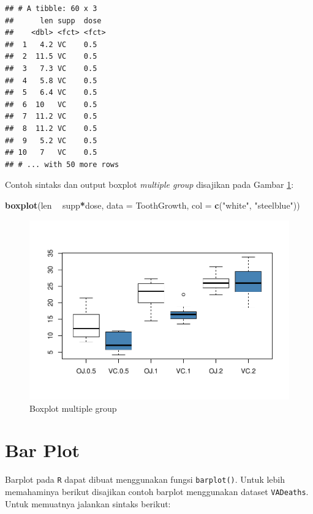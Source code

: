 \documentclass[]{book}
\newenvironment{Shaded}{\begin{snugshade}}{\end{snugshade}}
\newcommand{\KeywordTok}[1]{\textcolor[rgb]{0.13,0.29,0.53}{\textbf{#1}}}
\newcommand{\DataTypeTok}[1]{\textcolor[rgb]{0.13,0.29,0.53}{#1}}
\newcommand{\StringTok}[1]{\textcolor[rgb]{0.31,0.60,0.02}{#1}}
\newcommand{\OperatorTok}[1]{\textcolor[rgb]{0.81,0.36,0.00}{\textbf{#1}}}
\newcommand{\NormalTok}[1]{#1}
\begin{document}
\begin{verbatim}
## # A tibble: 60 x 3
##      len supp  dose 
##    <dbl> <fct> <fct>
##  1   4.2 VC    0.5  
##  2  11.5 VC    0.5  
##  3   7.3 VC    0.5  
##  4   5.8 VC    0.5  
##  5   6.4 VC    0.5  
##  6  10   VC    0.5  
##  7  11.2 VC    0.5  
##  8  11.2 VC    0.5  
##  9   5.2 VC    0.5  
## 10   7   VC    0.5  
## # ... with 50 more rows
\end{verbatim}

Contoh sintaks dan output boxplot \emph{multiple group} disajikan pada
Gambar \ref{fig:boxplot4}:

\begin{Shaded}
\begin{Highlighting}[]
\KeywordTok{boxplot}\NormalTok{(len }\OperatorTok{~}\StringTok{ }\NormalTok{supp}\OperatorTok{*}\NormalTok{dose, }\DataTypeTok{data =}\NormalTok{ ToothGrowth,}
        \DataTypeTok{col =} \KeywordTok{c}\NormalTok{(}\StringTok{"white"}\NormalTok{, }\StringTok{"steelblue"}\NormalTok{))}
\end{Highlighting}
\end{Shaded}

\begin{figure}

{\centering \includegraphics[width=0.7\linewidth]{EnvStat_files/figure-latex/boxplot4-1} 

}

\caption{Boxplot multiple group}\label{fig:boxplot4}
\end{figure}

\section{Bar Plot}\label{bar-plot}

Barplot pada \texttt{R} dapat dibuat menggunakan fungsi
\texttt{barplot()}. Untuk lebih memahaminya berikut disajikan contoh
barplot menggunakan dataset \texttt{VADeaths}. Untuk memuatnya jalankan
sintaks berikut:
\end{document}
